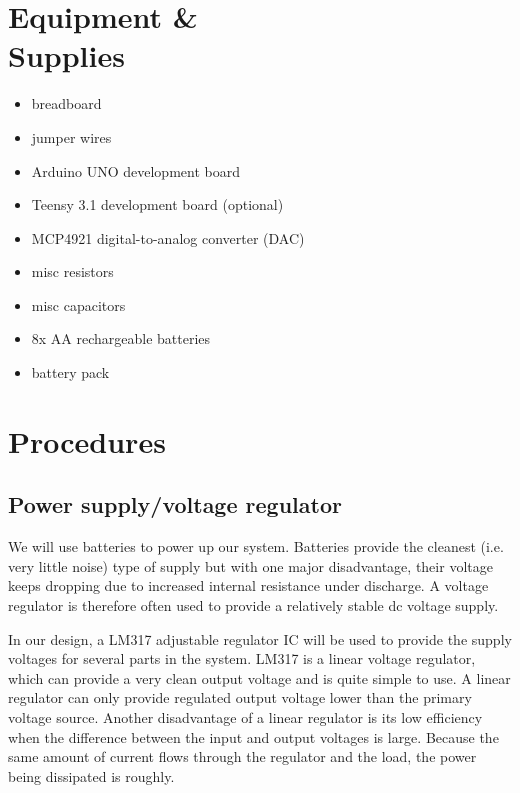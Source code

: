 \documentclass[letterpaper, 11pt]{article}
\begin{document}
\section{Equipment \& \\Supplies}

\begin{itemize}[itemsep=0.5ex]
\item breadboard
\item jumper wires
\item Arduino UNO development board
\item Teensy 3.1 development board (optional)
\item MCP4921 digital-to-analog converter (DAC)
\item misc resistors
\item misc capacitors
\item 8x AA rechargeable batteries
\item battery pack
\end{itemize}



\section{Procedures}

\subsection{Power supply/voltage regulator}

We will use batteries to power up our system. Batteries provide the cleanest (i.e. very little noise) type of supply but with one major disadvantage, their voltage keeps dropping due to increased internal resistance under discharge. A voltage regulator is therefore often used to provide a relatively stable dc voltage supply.

In our design, a LM317 adjustable regulator IC will be used to provide the supply voltages for several parts in the system. LM317 is a linear voltage regulator, which can provide a very clean output voltage and is quite simple to use. A linear regulator can only provide regulated output voltage lower than the primary voltage source. Another disadvantage of a linear regulator is its low efficiency when the difference between the input and output voltages is large. Because the same amount of current flows through the regulator and the load, the power being dissipated is roughly.
\end{document}
